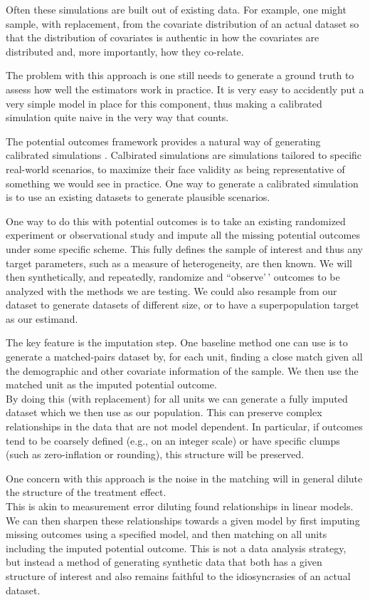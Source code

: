 \documentclass[
]{book}
\begin{document}
Often these simulations are built out of existing data.
For example, one might sample, with replacement, from the covariate distribution of an actual dataset so that the distribution of covariates is authentic in how the covariates are distributed and, more importantly, how they co-relate.

The problem with this approach is one still needs to generate a ground truth to assess how well the estimators work in practice.
It is very easy to accidently put a very simple model in place for this component, thus making a calibrated simulation quite naive in the very way that counts.

The potential outcomes framework provides a natural way of generating calibrated simulations \citep{Kern_calibrated}.
Calbirated simulations are simulations tailored to specific real-world scenarios, to maximize their face validity as being representative of something we would see in practice.
One way to generate a calibrated simulation is to use an existing datasets to generate plausible scenarios.

One way to do this with potential outcomes is to take an existing randomized experiment or observational study and impute all the missing potential outcomes under some specific scheme.
This fully defines the sample of interest and thus any target parameters, such as a measure of heterogeneity, are then known.
We will then synthetically, and repeatedly, randomize and ``observe'\,' outcomes to be analyzed with the methods we are testing.
We could also resample from our dataset to generate datasets of different size, or to have a superpopulation target as our estimand.

The key feature is the imputation step.
One baseline method one can use is to generate a matched-pairs dataset by, for each unit, finding a close match given all the demographic and other covariate information of the sample. We then use the matched unit as the imputed potential outcome.\\
By doing this (with replacement) for all units we can generate a fully imputed dataset which we then use as our population.
This can preserve complex relationships in the data that are not model dependent.
In particular, if outcomes tend to be coarsely defined (e.g., on an integer scale) or have specific clumps (such as zero-inflation or rounding), this structure will be preserved.

One concern with this approach is the noise in the matching will in general dilute the structure of the treatment effect.\\
This is akin to measurement error diluting found relationships in linear models.
We can then sharpen these relationships towards a given model by first imputing missing outcomes using a specified model, and then matching on all units including the imputed potential outcome.
This is not a data analysis strategy, but instead a method of generating synthetic data that both has a given structure of interest and also remains faithful to the idiosyncrasies of an actual dataset.
\end{document}
